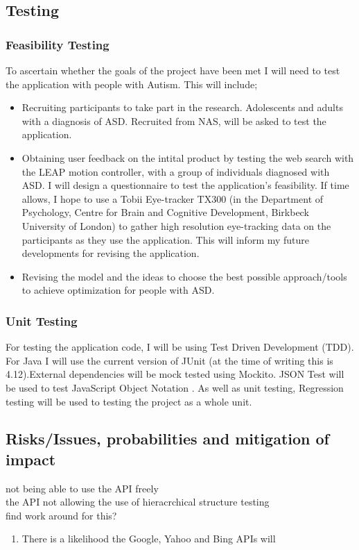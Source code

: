 \documentclass[10pt]{article}
\begin{document}
\subsection{Testing}
\subsubsection{Feasibility Testing}
To ascertain whether the goals of the project have been met I will need to test the application with people with Autism. This will include;
\begin{itemize}
\item Recruiting participants to take part in the research. Adolescents and adults with a diagnosis of ASD. Recruited from NAS, will be asked to test the application.
\item Obtaining user feedback on the intital product by testing the web search with the LEAP motion controller, with a group of individuals diagnosed with ASD. I will design a questionnaire to test the application's feasibility. If time allows, I hope to use a Tobii Eye-tracker TX300 (in the Department of Psychology, Centre for Brain and Cognitive Development, Birkbeck University of London) to gather high resolution eye-tracking data on the participants as they use the application. This will inform my future developments for revising the application.
\item Revising the model and the ideas to choose the best possible approach/tools to achieve optimization for people with ASD.
\end{itemize}

\subsubsection{Unit Testing}
For testing the application code, I will be using Test Driven Development (TDD). For Java I will use the current version of JUnit (at the time of writing this is 4.12).External dependencies will be mock tested using Mockito. JSON Test will be used to test JavaScript Object Notation \cite{jsontest}. As well as unit testing, Regression testing will be used to testing the project as a whole unit.

\subsection{Risks/Issues, probabilities and mitigation of impact}
not being able to use the API freely\\
the API not allowing the use of hieracrchical structure testing\\
find work around for this?
\begin{enumerate}
\item There is a likelihood the Google, Yahoo and Bing APIs will 
\end{enumerate}
\end{document}
